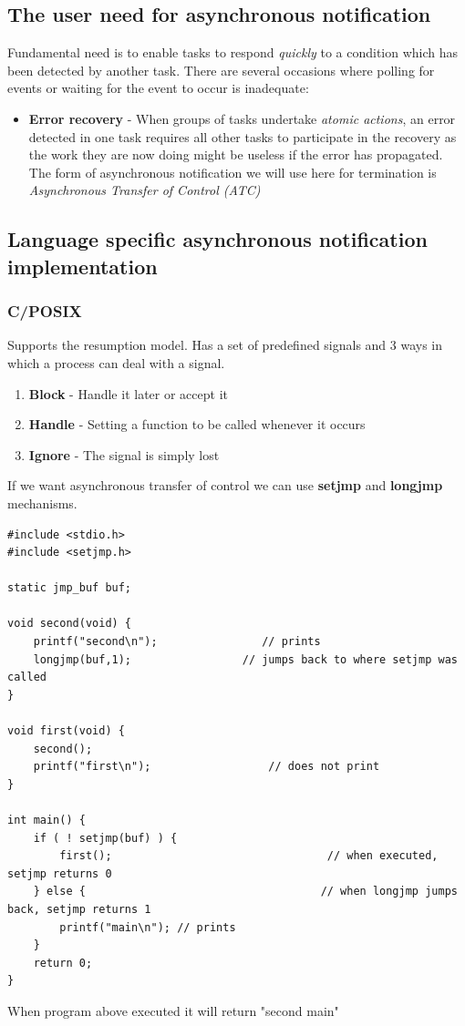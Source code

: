 \subsection{The user need for asynchronous notification}
Fundamental need is to enable tasks to respond \textit{quickly} to a condition which has been detected by another task. There are several occasions where polling for events or waiting for the event to occur is inadequate:
\begin{itemize}
\item \textbf{Error recovery} - When groups of tasks undertake \textit{atomic actions}, an error detected in one task requires all other tasks to participate in the recovery as the work they are now doing might be useless if the error has propagated. The form of asynchronous notification we will use here for termination is \textit{Asynchronous Transfer of Control (ATC)}
\end{itemize}

\subsection{Language specific asynchronous notification implementation}
\subsubsection{C/POSIX}
Supports the resumption model. Has a set of predefined signals and 3 ways in which a process can deal with a signal. 
\begin{enumerate}
\item \textbf{Block} - Handle it later or accept it
\item \textbf{Handle} - Setting a function to be called whenever it occurs
\item \textbf{Ignore} - The signal is simply lost
\end{enumerate}
If we want asynchronous transfer of control we can use \textbf{setjmp} and \textbf{longjmp} mechanisms. 
\begin{verbatim}
#include <stdio.h>
#include <setjmp.h>

static jmp_buf buf;

void second(void) {
    printf("second\n");			 	   // prints
    longjmp(buf,1); 				// jumps back to where setjmp was called
}

void first(void) {
    second();
    printf("first\n"); 					// does not print
}

int main() {
    if ( ! setjmp(buf) ) {
        first(); 								 // when executed, setjmp returns 0
    } else { 									// when longjmp jumps back, setjmp returns 1
        printf("main\n"); // prints
    }
    return 0;
}
\end{verbatim}
When program above executed it will return "second main"

